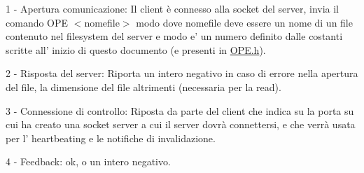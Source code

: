 1 -\/ Apertura comunicazione\+: Il client è connesso alla socket del server, invia il comando {\ttfamily O\+P\+E $<$nomefile$>$ modo} dove nomefile deve essere un nome di un file contenuto nel filesystem del server e modo e' un numero definito dalle costanti scritte all' inizio di questo documento (e presenti in \hyperlink{OPE_8h}{O\+P\+E.\+h}).
\begin{DoxyItemize}
\item 2 -\/ Risposta del server\+: Riporta un intero negativo in caso di errore nella apertura del file, la dimensione del file altrimenti (necessaria per la read).
\item 3 -\/ Connessione di controllo\+: Riposta da parte del client che indica su la porta su cui ha creato una socket server a cui il server dovrà connettersi, e che verrà usata per l' heartbeating e le notifiche di invalidazione.
\item 4 -\/ Feedback\+: ok, o un intero negativo. 
\end{DoxyItemize}